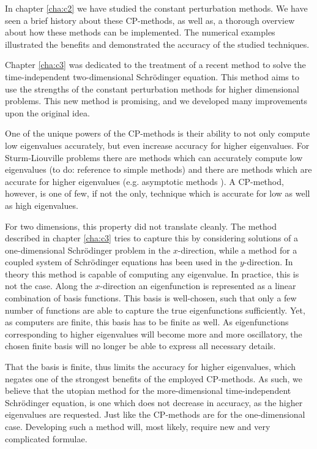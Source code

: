 

\label{cha:c4}

In chapter \ref{cha:c2} we have studied the constant perturbation methods. We have seen a brief history about these CP-methods, as well as, a thorough overview about how these methods can be implemented. The numerical examples illustrated the benefits and demonstrated the accuracy of the studied techniques.

Chapter \ref{cha:c3} was dedicated to the treatment of a recent method to solve the time-independent two-dimensional Schrödinger equation. This method aims to use the strengths of the constant perturbation methods for higher dimensional problems. This new method is promising, and we developed many improvements upon the original idea.

One of the unique powers of the CP-methods is their ability to not only compute low eigenvalues accurately, but even increase accuracy for higher eigenvalues. For Sturm-Liouville problems there are methods which can accurately compute low eigenvalues ({\color{red}to do: reference to simple methods}) and there are methods which are accurate for higher eigenvalues (e.g. asymptotic methods \cite{kuzmina_asymptotic_2000,zhukova_asymptotic_2020}). A CP-method, however, is one of few, if not the only, technique which is accurate for low as well as high eigenvalues.

For two dimensions, this property did not translate cleanly. The method described in chapter \ref{cha:c3} tries to capture this by considering solutions of a one-dimensional Schrödinger problem in the $x$-direction, while a method for a coupled system of Schrödinger equations has been used in the $y$-direction. In theory this method is capable of computing any eigenvalue. In practice, this is not the case. Along the $x$-direction an eigenfunction is represented as a linear combination of basis functions. This basis is well-chosen, such that only a few number of functions are able to capture the true eigenfunctions sufficiently. Yet, as computers are finite, this basis has to be finite as well. As eigenfunctions corresponding to higher eigenvalues will become more and more oscillatory, the chosen finite basis will no longer be able to express all necessary details.

That the basis is finite, thus limits the accuracy for higher eigenvalues, which negates one of the strongest benefits of the employed CP-methods. As such, we believe that the utopian method for the more-dimensional time-independent Schrödinger equation, is one which does not decrease in accuracy, as the higher eigenvalues are requested. Just like the CP-methods are for the one-dimensional case. Developing such a method will, most likely, require new and very complicated formulae.

